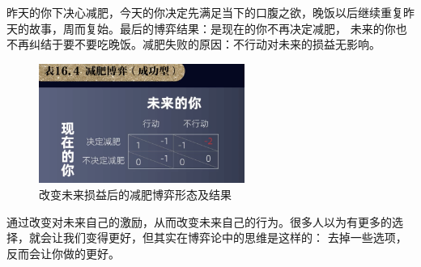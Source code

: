 \documentclass[12pt, a4paper]{article}
\begin{document}
\begin{CJK*}{UTF8}{gbsn}
        昨天的你下决心减肥，今天的你决定先满足当下的口腹之欲，晚饭以后继续重复昨天的故事，周而复始。最后的博弈结果：是现在的你不再决定减肥，
        未来的你也不再纠结于要不要吃晚饭。减肥失败的原因：不行动对未来的损益无影响。

        \begin{figure}[htbp]
            \centering
			\includegraphics[width=0.6\textwidth]{./figures/catch2023-08-02-00.09.24.png}
            \caption{改变未来损益后的减肥博弈形态及结果}
        \end{figure}

        通过改变对未来自己的激励，从而改变未来自己的行为。很多人以为有更多的选择，就会让我们变得更好，但其实在博弈论中的思维是这样的：
        去掉一些选项，反而会让你做的更好。

    \end{CJK*}
\end{document}
